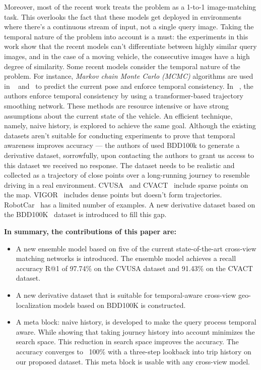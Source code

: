 \documentclass[10pt,letterpaper]{article}
\newif\ifhighlight
\newcommand{\hlb}[1]{\ifhighlight{\hl{#1}}\else{#1}\fi}
\begin{document}
Moreover, most of the recent work treats the problem as a 1-to-1 image-matching task. This overlooks the fact that these models get deployed in environments where there's a continuous stream of input, not a single query image. Taking the temporal nature of the problem into account is a must: \hlb{the experiments in this work show} that the recent models can't differentiate between highly similar query images, and in the case of a moving vehicle, the consecutive images have a high degree of similarity. Some recent models \hlb{consider} the temporal nature of the problem. \hlb{For instance, \emph{Markov chain Monte Carlo (MCMC)} algorithms are used in} ~\cite{bib7}  and~\cite{bib20,bib21,bib22} to predict the current pose and enforce temporal consistency. \hlb{In} ~\cite{bib24}, \hlb{the authors enforce} temporal consistency by using a transformer-based trajectory smoothing network. \hlb{These} methods are resource intensive or have strong assumptions about the current state of the vehicle. \hlb{An efficient technique, namely, naive history, is explored} to achieve the same goal.
Although the existing datasets aren't suitable for conducting experiments to prove that temporal awareness improves accuracy  — \hlb{the authors of} \cite{bib24} used BDD100k to generate a derivative dataset, sorrowfully, upon contacting the authors to grant us access to this dataset we received no response. The dataset needs to be realistic and collected as a trajectory of close points over a long-running journey to resemble driving in a real environment.  CVUSA~\cite{bib55} and CVACT~\cite{bib4} include sparse points on the map. VIGOR~\cite{bib5} includes dense points but doesn't form trajectories. RobotCar~\cite{bib6} has a limited number of examples. \hlb{A new derivative dataset} based on the BDD100K~\cite{bib12} dataset \hlb{is introduced} to fill this gap.

\hlb{\bf In summary, the contributions of this paper are:}
\begin{itemize}
    \item \hlb{A new ensemble model based on five of the current state-of-the-art  cross-view matching networks is introduced}. The ensemble model achieves a recall accuracy R@1 of 97.74\% on the CVUSA dataset and 91.43\% on the CVACT dataset.
    \item \hlb{A new derivative dataset that is suitable for temporal-aware cross-view geo-localization models based on BDD100K is constructed}.
    \item \hlb{A meta block: naive history, is developed to make the query process temporal aware}. \hlb{While showing} that taking journey history into account minimizes the search space. This reduction in search space improves the accuracy.  The accuracy converges to ~100\% with a three-step lookback into trip history on our proposed dataset. This meta block is usable with any \hlb{cross-view} model.
\end{itemize}
\end{document}

